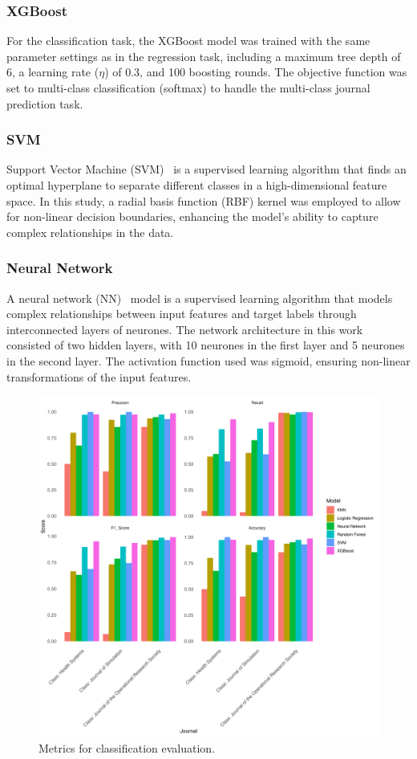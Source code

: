 \documentclass[9pt,twocolumn,twoside]{pnas-new}
\begin{document}
\subsubsection*{XGBoost}

For the classification task, the XGBoost model was trained with the same parameter settings as in the regression task, including a maximum tree depth of 6, a learning rate ($\eta$) of 0.3, and 100 boosting rounds. The objective function was set to multi-class classification (softmax) to handle the multi-class journal prediction task.

\subsubsection*{SVM}
Support Vector Machine (SVM)~\cite{708428} is a supervised learning algorithm that finds an optimal hyperplane to separate different classes in a high-dimensional feature space. In this study, a radial basis function (RBF) kernel was employed to allow for non-linear decision boundaries, enhancing the model's ability to capture complex relationships in the data. 

\subsubsection*{Neural Network}
A neural network (NN)~\cite{mcculloch1943logical} model is a supervised learning algorithm that models complex relationships between input features and target labels through interconnected layers of neurones. The network architecture in this work consisted of two hidden layers, with 10 neurones in the first layer and 5 neurones in the second layer. The activation function used was sigmoid, ensuring non-linear transformations of the input features. 


\begin{figure}%
\centering
\includegraphics[width=.9\linewidth]{regression/class_metrics_all.png}
\caption{Metrics for classification evaluation.}
\label{fig:class_metrics_all}
\end{figure}
\end{document}
